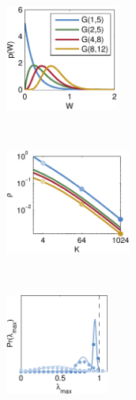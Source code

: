 
\begin{figure}[!ht]
\vspace{-.5em}
\begin{center}
\begin{subfigure}[b]{.22\textwidth}
\caption{}
\label{fig:stability_p_w}
\includegraphics[height=1.35in]{figures/ch2/stability_p_w} 
\end{subfigure}
~
\begin{subfigure}[b]{.22\textwidth}
\caption{}
\label{fig:stability_max_rho}
\includegraphics[height=1.35in]{figures/ch2/stability_max_rho} 
\end{subfigure}
~
\hspace{1em}
\begin{subfigure}[b]{.22\textwidth}
\caption{}
\label{fig:stability_1_5}
\includegraphics[height=1.3in]{figures/ch2/stability_1_5} 
\end{subfigure}
~
\begin{subfigure}[b]{.22\textwidth}
\caption{}
\label{fig:stability_8_12}

\end{subfigure}
\end{center}
\end{figure}
